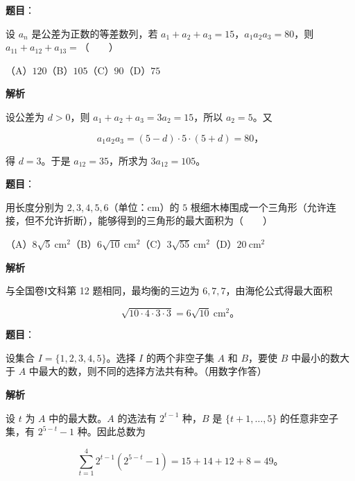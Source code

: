 \begin{answer}

\textbf{题目}：

设 $a_n$ 是公差为正数的等差数列，若 $a_1+a_2+a_3=15$，$a_1a_2a_3=80$，则 $a_{11}+a_{12}+a_{13}=$\mbox{（　　）}

（A）$120$\quad（B）$105$\quad（C）$90$\quad（D）$75$

\textbf{解析}

设公差为 $d>0$，则 $a_1+a_2+a_3=3a_2=15$，所以 $a_2=5$。又

\nopagebreak[4]
\[
a_1a_2a_3=(5-d)\cdot5\cdot(5+d)=80\text{，}
\]

得 $d=3$。于是 $a_{12}=35$，所求为 $3a_{12}=105$。


\end{answer}
\begin{answer}

\textbf{题目}：

用长度分别为 $2,3,4,5,6$（单位：cm）的 $5$ 根细木棒围成一个三角形（允许连接，但不允许折断），能够得到的三角形的最大面积为\mbox{（　　）}

（A）$8\sqrt5\ \mathrm{cm}^2$\quad（B）$6\sqrt{10}\ \mathrm{cm}^2$\quad（C）$3\sqrt{55}\ \mathrm{cm}^2$\quad（D）$20\ \mathrm{cm}^2$

\textbf{解析}

与全国卷Ⅰ文科第 12 题相同，最均衡的三边为 $6,7,7$，由海伦公式得最大面积

\nopagebreak[4]
\[
\sqrt{10\cdot4\cdot3\cdot3}=6\sqrt{10}\ \mathrm{cm}^2\text{。}
\]


\end{answer}
\begin{answer}

\textbf{题目}：

设集合 $I=\{1,2,3,4,5\}$。选择 $I$ 的两个非空子集 $A$ 和 $B$，要使 $B$ 中最小的数大于 $A$ 中最大的数，则不同的选择方法共有\gkblank{}种。（用数字作答）

\textbf{解析}

设 $t$ 为 $A$ 中的最大数。$A$ 的选法有 $2^{t-1}$ 种，$B$ 是 $\{t+1,\ldots,5\}$ 的任意非空子集，有 $2^{5-t}-1$ 种。因此总数为

\nopagebreak[4]
\[
\sum_{t=1}^{4}2^{t-1}(2^{5-t}-1)=15+14+12+8=49\text{。}
\]


\end{answer}
